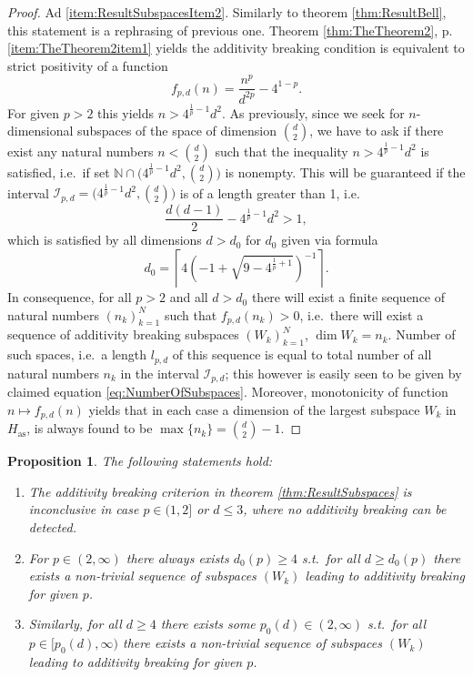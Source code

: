 \documentclass[reqno]{amsart}
\theoremstyle{plain}
\newtheorem{proposition}[theorem]{Proposition}
\theoremstyle{note}
\newcommand{\aspace}{H_{\mathrm{as}}}
\newcommand{\naturals}{\mathbb{N}}
\begin{document}
\begin{proof}
Ad \ref{item:ResultSubspacesItem2}. Similarly to theorem \ref{thm:ResultBell}, this statement is a rephrasing of previous one. Theorem \ref{thm:TheTheorem2}, p. \ref{item:TheTheorem2item1} yields the additivity breaking condition is equivalent to strict positivity of a function
\begin{equation}
    f_{p,d}(n) = \frac{n^p}{d^{2p}} - 4^{1-p}.
\end{equation}
For given $p>2$ this yields $n > 4^{\frac{1}{p}-1}d^2$. As previously, since we seek for $n$-dimensional subspaces of the space of dimension $\binom{d}{2}$, we have to ask if there exist any natural numbers $n < \binom{d}{2}$ such that the inequality $n > 4^{\frac{1}{p}-1}d^2$ is satisfied, i.e.~if set $\naturals \cap \big(4^{\frac{1}{p}-1}d^2 , \binom{d}{2}\big)$ is nonempty. This will be guaranteed if the interval $\mathcal{I}_{p,d} = \big(4^{\frac{1}{p}-1} d^2 , \binom{d}{2}\big)$ is of a length greater than 1, i.e.
\begin{equation}
    \frac{d(d-1)}{2} - 4^{\frac{1}{p}-1} d^2 > 1,
\end{equation}
which is satisfied by all dimensions $d > d_0$ for $d_0$ given via formula
\begin{equation}\label{eq:d0pSubspaces}
    d_0 = \left\lceil 4\left(-1 + \sqrt{9-4^{\frac{1}{p}+1}}\right)^{-1} \right\rceil .
\end{equation}
In consequence, for all $p>2$ and all $d>d_0$ there will exist a finite sequence of natural numbers $(n_k)_{k=1}^{N}$ such that $f_{p,d}(n_k) > 0$, i.e.~there will exist a sequence of additivity breaking subspaces $(W_k)_{k=1}^{N}$, $\dim{W_k} = n_k$. Number of such spaces, i.e.~a length $l_{p,d}$ of this sequence is equal to total number of all natural numbers $n_k$ in the interval $\mathcal{I}_{p,d}$; this however is easily seen to be given by claimed equation \eqref{eq:NumberOfSubspaces}. Moreover, monotonicity of function $n \mapsto f_{p,d}(n)$ yields that in each case a dimension of the largest subspace $W_k$ in $\aspace$, is always found to be $\max{\{n_k\}}=\binom{d}{2} - 1$.
\end{proof}

\begin{proposition}
\label{prop:RegionRSubspaces}
The following statements hold:
\begin{enumerate}
    \item \label{RegRSubspacesitem1} The additivity breaking criterion in theorem \ref{thm:ResultSubspaces} is inconclusive in case $p \in (1,2]$ or $d \leqslant 3$, where no additivity breaking can be detected.
    \item \label{RegRSubspacesitem3} For $p\in(2,\infty)$ there always exists $d_0 (p) \geqslant 4$ s.t.~for all $d \geqslant d_0 (p)$ there exists a non-trivial sequence of subspaces $(W_k)$ leading to additivity breaking for given $p$.
    \item \label{RegRSubspacesitem4} Similarly, for all $d \geqslant 4$ there exists some $p_0 (d) \in (2,\infty)$ s.t.~for all $p \in [p_0 (d),\infty)$ there exists a non-trivial sequence of subspaces $(W_k)$ leading to additivity breaking for given $p$.
\end{enumerate}
\end{proposition}
\end{document}
